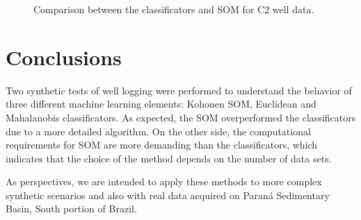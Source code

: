 \documentclass{cph18}
\begin{document}
\begin{figure}[H]
	\centering
	\setlength{\fboxsep}{8pt}
	\setlength{\fboxrule}{0.1pt}
	\caption{Comparison between the classificators and SOM for C2 well data. }
	\label{C2}
\end{figure}

\section{Conclusions}

Two synthetic tests of well logging were performed to understand the behavior of three different machine learning elements: Kohonen SOM, Euclidean and Mahalanobis classificators. As expected, the SOM overperformed the classificators due to a more detailed algorithm. On the other side, the computational requirements for SOM are more demanding than the classificators, which indicates that the choice of the method depends on the number of data sets.   

As perspectives, we are intended to apply these methods to more complex synthetic scenarios and also with real data acquired on Paran\'a Sedimentary Basin, South portion of Brazil. 


\end{document}
